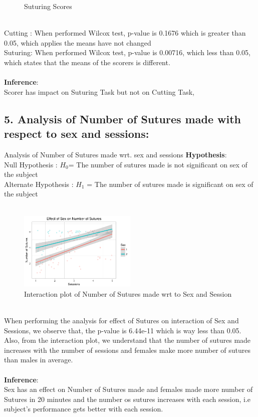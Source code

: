 \documentclass[12pt,epsf]{report}
\begin{document}
{\begin{figure}[!htb]
\begin{minipage}[c]{0.5\linewidth}
	\caption{Suturing Scores}
	\end{minipage}
\end{figure}
\\
Cutting : When performed Wilcox test, p-value is 0.1676 which is greater than 0.05, which applies the means have not changed\\
Suturing: When performed Wilcox test, p-value is 0.00716, which less than 0.05, which states that the means of the scorers is different. \\
\\
\textbf{Inference}:\\
Scorer has impact on Suturing Task but not on Cutting Task,\\
\FloatBarrier
\subsection*{5. Analysis of Number of Sutures made with respect to sex and sessions:}
 {Analysis of Number of Sutures made wrt. sex and sessions}
\textbf{Hypothesis}:\\
Null Hypothesis : $H_0 $= The number of sutures made is not significant on sex of the subject\\
Alternate Hypothesis : $H_1$ =  The number of sutures made is  significant on sex of the subject\\
\\
\begin{figure}[!htb]
	\centering
	\includegraphics[width=0.5\textwidth]{SuturingVsSex.pdf}
	\caption{Interaction plot of Number of Sutures made wrt to Sex and Session}
	\centering
\end{figure}
\\
When performing the analysis for effect of Sutures on interaction of Sex and Sessions, we observe that, the p-value is 6.44e-11 which is way less than 0.05.\\
Also, from the interaction plot, we understand that the number of sutures made increases with the number of sessions and females make more number of sutures than males in average.\\
\\
\textbf{Inference}:\\
Sex has an effect on Number of Sutures made and females made more number of Sutures in 20 minutes and the number os sutures increases with each session, i.e subject's performance gets better with each session.\\
\FloatBarrier
}
\end{document}

